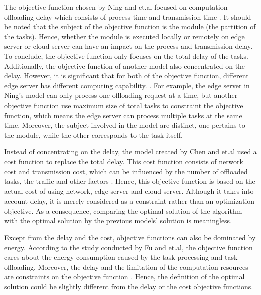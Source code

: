 \documentclass[a4paper,11pt]{article}
\begin{document}
The objective function chosen by Ning and et.al focused on computation offloading delay which consists of process time and transmission time \cite{A_Cooperative_Partial_Computation_Offloading_Scheme_for_Mobile_Edge}. It should be noted that the subject of the objective function is the module (the partition of the tasks). Hence, whether the module is executed locally or remotely on edge server or cloud server can have an impact on the process and transmission delay. To conclude, the objective function only focuses on the total delay of the tasks. Additionally, the objective function of another model also concentrated on the delay. However, it is significant that for both of the objective function, different edge server has different computing capability.  \cite{no_cloud_1_density}. For example, the edge server in Ning's model can only process one offloading request at a time, but another objective function use maximum size of total tasks to constraint the objective function, which means the edge server can process multiple tasks at the same time. Moreover, the subject involved in the model are distinct, one pertains to the module, while the other corresponds to the task itself. \newline

Instead of concentrating on the delay, the model created by Chen and et.al used a cost function to replace the total delay. This cost function consists of network cost and transmission cost, which can be influenced by the number of offloaded tasks, the traffic and other factors \cite{full_offload_2}. Hence, this objective function is based on the actual cost of using network, edge server and cloud server. Although it takes into account delay, it is merely considered as a constraint rather than an optimization objective. As a consequence, comparing the optimal solution of the algorithm with the optimal solution by the previous models' solution is meaningless.\newline

Except from the delay and the cost, objective functions can also be dominated by energy. According to the study conducted by Fu and et.al, the objective function cares about the energy consumption caused by the task processing and task offloading. Moreover, the delay and the limitation of the computation resources are constraints on the objective function \cite{objective_energy_2}. Hence, the definition of the optimal solution could be slightly different from the delay or the cost objective functions. \newline
\end{document}
